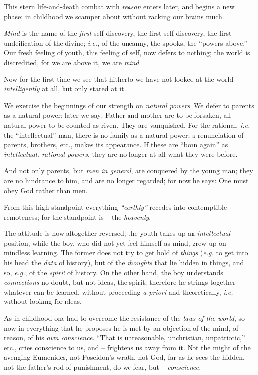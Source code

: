 \documentclass[12pt,a4paper]{book}
\begin{document}
This stern life-and-death combat with \textit{reason} enters later, and begins 
a new phase; in childhood we scamper about without racking our brains much.

\textit{Mind} is the name of the \textit{first} self-discovery, the first 
self-discovery, the first undeification of the divine; \textit{i.e.}, of the 
uncanny, the spooks, the ``powers above.'' Our fresh feeling of youth, this 
feeling of self, now defers to nothing; the world is discredited, for we are 
above it, we are \textit{mind}.

Now for the first time we see that hitherto we have not looked at the world 
\textit{intelligently} at all, but only stared at it.

We exercise the beginnings of our strength on \textit{natural powers}. We 
defer to parents as a natural power; later we say: Father and mother are to be 
forsaken, all natural power to be counted as riven. They are vanquished. For 
the rational, \textit{i.e.} the ``intellectual'' man, there is no family as 
a natural power; a renunciation of parents, brothers, etc., makes its 
appearance. If these are ``born again'' as \textit{intellectual, rational 
powers}, they are no longer at all what they were before.

And not only parents, but \textit{men in general}, are conquered by the young 
man; they are no hindrance to him, and are no longer regarded; for now he 
says: One must obey God rather than men.

From this high standpoint everything \textit{``earthly''} recedes into 
contemptible remoteness; for the standpoint is -- the \textit{heavenly}.

The attitude is now altogether reversed; the youth takes up an 
\textit{intellectual} position, while the boy, who did not yet feel himself as 
mind, grew up on mindless learning. The former does not try to get hold of 
\textit{things} (\textit{e.g.} to get into his head the \textit{data} of 
history), but of the \textit{thoughts} that lie hidden in things, and so, 
\textit{e.g.}, of the \textit{spirit} of history. On the other hand, the boy 
understands \textit{connections} no doubt, but not ideas, the spirit; 
therefore he strings together whatever can be learned, without proceeding 
\textit{a priori} and theoretically, \textit{i.e.} without looking for ideas.

As in childhood one had to overcome the resistance of the \textit{laws of the 
world}, so now in everything that he proposes he is met by an objection of the 
mind, of reason, of his \textit{own conscience}. ``That is unreasonable, 
unchristian, unpatriotic,'' etc., cries conscience to us, and -- frightens us 
away from it. Not the might of the avenging Eumenides, not Poseidon's wrath, 
not God, far as he sees the hidden, not the father's rod of punishment, do we 
fear, but -- \textit{conscience.}
\end{document}
